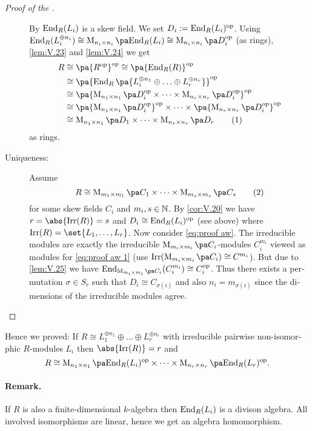 \documentclass[12pt,a4paper]{scrartcl}
\theoremstyle{cplain}
\theoremstyle{cplain}
\theoremstyle{cplain}
\theoremstyle{definition}
\begin{document}
\begin{otherlanguage}{english}
\begin{proof}[Proof of the ]
\begin{description}
    By  $\operatorname{End}_R(L_i)$ is a skew field. We set $D_i := \operatorname{End}_R(L_i)^{\operatorname{op}}$. Using $\End_R (L_i^{\oplus n_i}) \cong \Mat{n_i}{\End_R(L_i)} \cong \Mat{n_i}{D_i^{\op}}$ (as rings), \cref{lem:V.23} and \cref{lem:V.24} we get
    \begin{align*}
      R & \cong \pa{R^{\op}}^{\op} \cong \pa{\End_R(R)}^{\op} \\
      &\cong \pa{\End_R\pa{L_i^{\oplus n_1}\oplus \ldots \oplus L_r^{\oplus n_r}}}^{\op} \\
      &\cong \pa{\Mat {n_1}{D_i^{\op}}\times \cdots \times \Mat {n_r}{D_i^{\op}}}^{\op} \\
      &\cong \pa{\Mat {n_1}{D_i^{\op}}}^{\op}\times \cdots \times \pa{\Mat {n_r}{D_i^{\op}}}^{\op} \\
      &\cong \Mat{n_1}{D_1}\times \cdots \times \Mat{n_r}{D_r} \tag{1} \label{eq:proof aw 1}
    \end{align*}
    as rings.
    \item[Uniqueness:] Assume \begin{equation}R\cong \Mat{m_1}{C_1}\times\cdots\times \Mat{m_s}{C_s}\tag{2}\label{eq:proof aw}\end{equation} for some skew fields $C_i$ and $m_i,s\in\mathbb N$. By \cref{cor:V.20} we have $r = \abs{\Irr(R)} = s$ and $D_i \cong \operatorname{End}_R(L_i)^{\operatorname{op}}$ (see above) where $\Irr(R) = \set{L_1,\ldots,L_r}$. Now consider \eqref{eq:proof aw}. The irreducible modules are exactly the irreducible $\Mat{m_i}{C_i}$-modules $C_i^{m_i}$ viewed as modules for \eqref{eq:proof aw 1} (use $\Irr(\Mat{m_i}{C_i}) \cong C^{m_i}$). But due to \cref{lem:V.25} we have $\End_{\Mat{m_i}{C_i}}(C_i^{m_i})\cong C_i^{\op}$. Thus there exists a permutation $\sigma\in S_r$ such that $D_i\cong C_{\sigma(i)}$ and also $n_i=m_{\sigma(i)}$ since the dimensions of the irreducible modules agree.
    \qedhere
  \end{description}
\end{proof}

Hence we proved: If $R\cong L_1^{\oplus n_1}\oplus \ldots \oplus L_r^{\oplus n_r}$ with irreducible pairwise non-isomorphic $R$-modules $L_i$ then $\abs{\Irr(R)} = r$ and \[ R \cong \Mat{n_1}{\End_R(L_i)^{\op}}\times\cdots\times \Mat{n_r}{\End_R(L_r)^{\op}}. \]

\paragraph{Remark.} If $R$ is also a finite-dimensional $k$-algebra then $\operatorname{End}_R(L_i)$ is a divison algebra. All involved isomorphisms are linear, hence we get an algebra homomorphism.


\end{otherlanguage}
\end{document}
